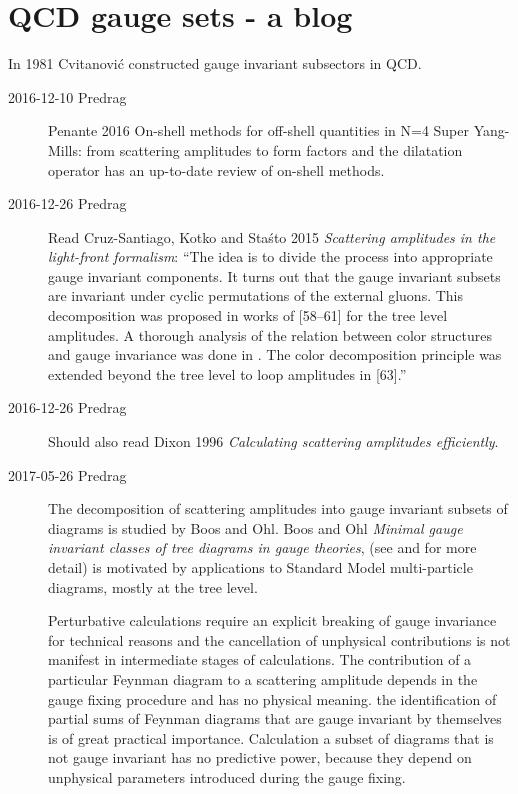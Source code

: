
\section{QCD gauge sets - a blog}
\label{sect:QCDgaugeSets}

In 1981 Cvitanovi\'c \etal{} constructed gauge invariant
subsectors in QCD.


\begin{description}

\item[2016-12-10 Predrag]
Penante 2016 {{On-shell methods for off-shell quantities in N=4
Super Yang-Mills: from scattering amplitudes to form factors and the
dilatation operator}} has an up-to-date review of on-shell methods.

\item[2016-12-26 Predrag] Read
Cruz-Santiago, Kotko and Sta{\'s}to 2015
{\em Scattering amplitudes in the light-front formalism}:
``The idea is to divide the process into appropriate gauge invariant
components. It turns out that the gauge invariant subsets are invariant
under cyclic permutations of the external gluons. This decomposition was
proposed in works of [58–61] for the tree level amplitudes. A thorough
analysis of the relation between color structures and gauge invariance
was done in . The color decomposition principle was
extended beyond the tree level to loop amplitudes in [63].''

\item[2016-12-26 Predrag]
Should also read Dixon 1996
{\em Calculating scattering amplitudes efficiently}.



\item[2017-05-26 Predrag]
The decomposition of scattering amplitudes into gauge invariant subsets
of diagrams is studied by Boos and Ohl.
Boos and Ohl
{\em Minimal gauge invariant classes of tree diagrams in gauge theories},
 (see  and
 for more detail) is motivated by applications to
Standard Model multi-particle diagrams, mostly at the tree level.

Perturbative calculations require an explicit breaking of gauge
invariance for technical reasons and the cancellation of unphysical
contributions is not manifest in intermediate stages of calculations. The
contribution of a particular Feynman diagram to a scattering amplitude
depends in the gauge fixing procedure and has no physical meaning.
the identification of partial sums of Feynman diagrams that are gauge
invariant by themselves is of great practical importance.
Calculation a subset of diagrams that is not gauge invariant has no
predictive power, because they depend on unphysical parameters introduced
during the gauge fixing.


\end{description}
